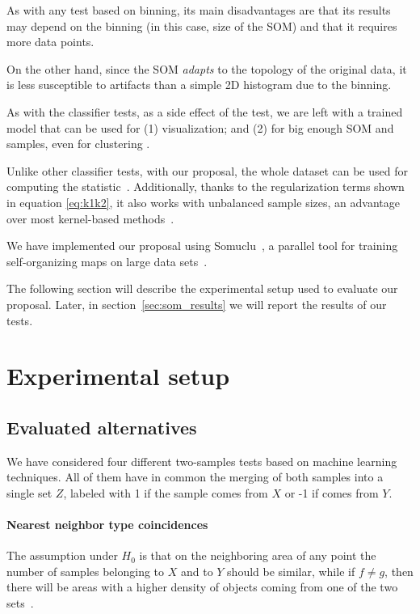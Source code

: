 As with any test based on binning, its main disadvantages are that its results may
depend on the binning (in this case, size of the \gls{SOM}) and that it requires
more data points.

On the other hand, since the \gls{SOM}  \textit{adapts} to the topology of the
original data, it is less susceptible to artifacts than a simple 2D histogram
due to the binning.

As with the classifier tests, as a side effect of the test, we are left with a
trained model that can be used for (1) visualization; and (2) for big enough
\gls{SOM}  and samples, even for clustering \cite{ultsch2005esom}.

Unlike other classifier tests, with our proposal, the whole dataset can be used
for computing the statistic~\cite{kirchler2020two}. Additionally, thanks to the
regularization terms shown in equation \ref{eq:k1k2}, it also works with
unbalanced sample sizes, an advantage over most kernel-based methods~\cite{song2021fast}.

We have implemented our proposal using Somuclu~\cite{wittek2013somoclu}, a parallel
tool for training self-organizing maps on large data sets~\cite{wittek2013somoclu}.

The following section will describe the experimental setup used to evaluate our proposal.
Later, in section~\ref{sec:som_results} we will report the results of our tests.

\section{Experimental setup}
\label{sec:som_exp_setup}

\subsection{Evaluated alternatives}

We have considered four different two-samples tests based on machine learning techniques.
All of them have in common the merging of both samples into a single set $Z$,
labeled with 1 if the sample comes from $X$ or -1 if comes from $Y$.

\paragraph{Nearest neighbor type coincidences}

The assumption under $H_0$ is that on the neighboring area of any point the number of samples
belonging to $X$ and to $Y$ should be similar, while if $f \neq g$, then there will be areas with
a higher density of objects coming from one of the two sets~\cite{Henze1988,Schilling1986b}.

